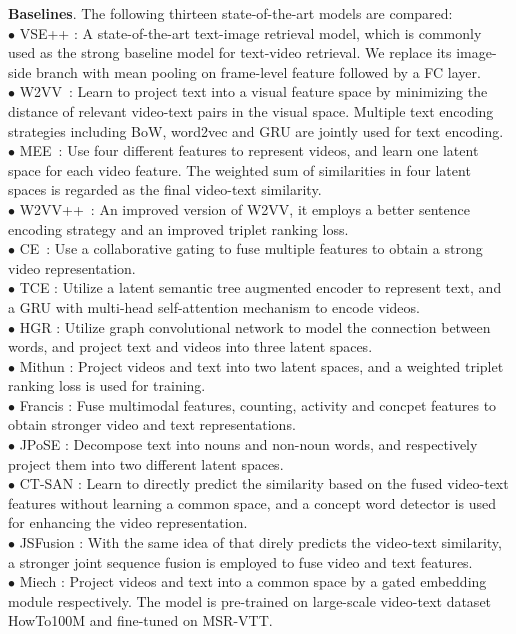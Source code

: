 \textbf{Baselines}. The following thirteen state-of-the-art models are compared:\\
$\bullet$ VSE++ \cite{faghri2017vse}: A state-of-the-art text-image retrieval model, which is commonly used as the strong baseline model for text-video retrieval. We replace its image-side branch with mean pooling on frame-level feature followed by a FC layer. \\ 
$\bullet$ W2VV~\cite{dong2018predicting}: Learn to project text into a visual feature space by minimizing the distance of relevant video-text pairs in the visual space. Multiple text encoding strategies including BoW, word2vec and GRU are jointly used for text encoding.  \\
$\bullet$ MEE~\cite{miech2018learning}: Use four different features to represent videos, and learn one latent space for each video feature. The weighted sum of similarities in four latent spaces is regarded as the final video-text similarity. \\
$\bullet$ W2VV++~\cite{li2019w2vv++}: An improved version of W2VV, it employs a better sentence encoding strategy and an improved triplet ranking loss.  \\
$\bullet$ CE~\cite{liu2019use}: Use a collaborative gating to fuse multiple features to obtain a strong video representation. \\
$\bullet$ TCE \cite{sigir2020tree}: Utilize a latent semantic tree \cite{tai2015improved} augmented encoder to represent text, and a GRU with multi-head self-attention mechanism \cite{vaswani2017attention} to encode videos. \\
$\bullet$ HGR \cite{chen2020fine}: Utilize graph convolutional network to model the connection between words, and project text and videos into three latent spaces. \\
$\bullet$ Mithun \etal \cite{mithun2018learning}: Project videos and text into two latent spaces, and a weighted triplet ranking loss is used for training.  \\
$\bullet$ Francis \etal \cite{iccv2019-francis}: Fuse multimodal features, \ie counting, activity and concpet features to obtain stronger video and text representations. \\
$\bullet$ JPoSE \cite{wray2019fine}: Decompose text into nouns and non-noun words, and respectively project them into two different latent spaces. \\
$\bullet$ CT-SAN \cite{yu2017end}: Learn to directly predict the similarity based on the fused video-text features without learning a common space, and a concept word detector is used for enhancing the video representation.    \\
$\bullet$ JSFusion \cite{yu2018joint}: With the same idea of \cite{yu2017end} that direly predicts the video-text similarity, a stronger joint sequence fusion is employed to fuse video and text features. \\
$\bullet$ Miech \etal \cite{miech2019howto100m}: Project videos and text into a common space by a gated embedding module respectively. The model is pre-trained on large-scale video-text dataset HowTo100M \cite{miech2019howto100m} and fine-tuned on MSR-VTT.

